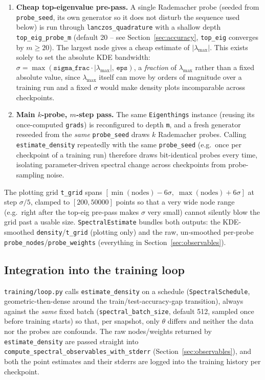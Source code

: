 \documentclass[11pt]{article}
\newcommand{\code}[1]{\texttt{#1}}
\begin{document}
\begin{enumerate}
\item \textbf{Cheap top-eigenvalue pre-pass.} A single Rademacher probe
(seeded from \code{probe_seed}, its own generator so it does not disturb
the sequence used below) is run through \code{lanczos_quadrature} with a
shallow depth \code{top_eig_probe_m} (default 20 -- see
Section~\ref{sec:accuracy}, \code{top_eig} converges by \(m\ge20\)). The
largest node gives a cheap estimate of \(|\lambda_{\max}|\). This exists
solely to set the absolute KDE bandwidth: \(\sigma =
\max(\code{sigma_frac} \cdot |\lambda_{\max}|,\, \code{eps})\), a
\emph{fraction} of \(\lambda_{\max}\) rather than a fixed absolute value,
since \(\lambda_{\max}\) itself can move by orders of magnitude over a
training run and a fixed \(\sigma\) would make density plots incomparable
across checkpoints.
\item \textbf{Main \(k\)-probe, \(m\)-step pass.} The same
\code{Eigenthings} instance (reusing its once-computed \code{grads}) is
reconfigured to depth \code{m}, and a fresh generator reseeded from the
\emph{same} \code{probe_seed} draws \(k\) Rademacher probes. Calling
\code{estimate_density} repeatedly with the same \code{probe_seed}
(e.g.\ once per checkpoint of a training run) therefore draws bit-identical
probes every time, isolating parameter-driven spectral change across
checkpoints from probe-sampling noise.
\end{enumerate}
The plotting grid \code{t_grid} spans \([\min(\text{nodes}) - 6\sigma,\;
\max(\text{nodes}) + 6\sigma]\) at step \(\sigma/5\), clamped to
\([200, 50000]\) points so that a very wide node range (e.g.\ right after
the top-eig pre-pass makes \(\sigma\) very small) cannot silently blow the
grid past a usable size. \code{SpectralEstimate} bundles both outputs: the
KDE-smoothed \code{density}/\code{t_grid} (plotting only) and the raw,
un-smoothed per-probe \code{probe_nodes}/\code{probe_weights}
(everything in Section~\ref{sec:observables}).

\subsection{Integration into the training loop}

\code{training/loop.py} calls \code{estimate_density} on a schedule
(\code{SpectralSchedule}, geometric-then-dense around the
train/test-accuracy-gap transition), always against the \emph{same} fixed
batch (\code{spectral_batch_size}, default 512, sampled once before
training starts) so that, per snapshot, only \(\theta\) differs and neither
the data nor the probes are confounds. The raw nodes/weights returned by
\code{estimate_density} are passed straight into
\code{compute_spectral_observables_with_stderr}
(Section~\ref{sec:observables}), and both the point estimates and their
stderrs are logged into the training history per checkpoint.
\end{document}
